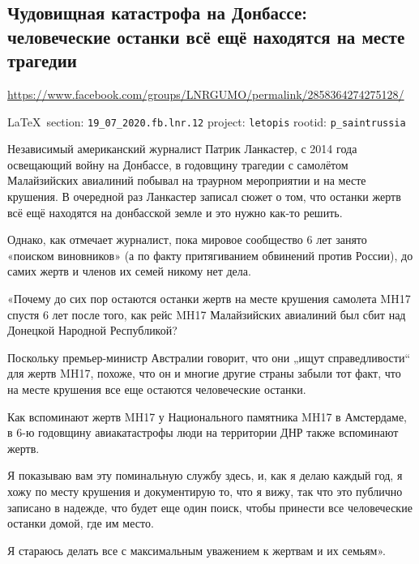  
 
  
\subsection{Чудовищная катастрофа на Донбассе: человеческие останки всё ещё находятся на месте трагедии}
\url{https://www.facebook.com/groups/LNRGUMO/permalink/2858364274275128/}

\vspace{0.5cm}
{\small\LaTeX~section: \verb|19_07_2020.fb.lnr.12| project: \verb|letopis| rootid: \verb|p_saintrussia|}
\vspace{0.5cm}

Независимый американский журналист Патрик Ланкастер, с 2014 года освещающий
войну на Донбассе, в годовщину трагедии с самолётом Малайзийских авиалиний
побывал на траурном мероприятии и на месте крушения. В очередной раз Ланкастер
записал сюжет о том, что останки жертв всё ещё находятся на донбасской земле и
это нужно как-то решить.

Однако, как отмечает журналист, пока мировое сообщество 6 лет занято «поиском
виновников» (а по факту притягиванием обвинений против России), до самих жертв
и членов их семей никому нет дела.

«Почему до сих пор остаются останки жертв на месте крушения самолета MH17
спустя 6 лет после того, как рейс MH17 Малайзийских авиалиний был сбит над
Донецкой Народной Республикой?

Поскольку премьер-министр Австралии говорит, что они „ищут справедливости“ для
жертв MH17, похоже, что он и многие другие страны забыли тот факт, что на месте
крушения все еще остаются человеческие останки.

Как вспоминают жертв MH17 у Национального памятника MH17 в Амстердаме, в 6-ю
годовщину авиакатастрофы люди на территории ДНР также вспоминают жертв.

Я показываю вам эту поминальную службу здесь, и, как я делаю каждый год, я хожу
по месту крушения и документирую то, что я вижу, так что это публично записано
в надежде, что будет еще один поиск, чтобы принести все человеческие останки
домой, где им место.

Я стараюсь делать все с максимальным уважением к жертвам и их семьям».
  
